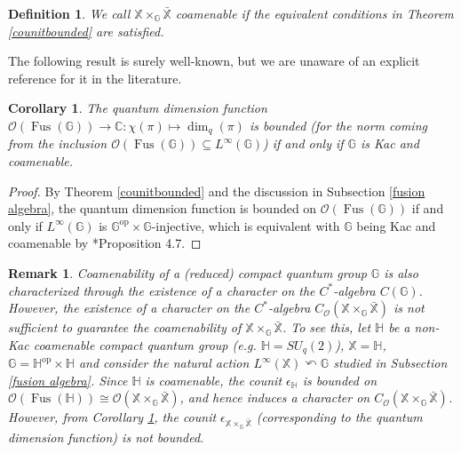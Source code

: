\documentclass[reqno]{amsart}
\numberwithin{equation}{section}
\newtheorem{Def}[Theorem]{Definition}
\newtheorem{Cor}[Theorem]{Corollary}
\newtheorem{Rem}[Theorem]{Remark}
\newcommand\XGX{\X\times_\G \bar{\X}}
\newcommand{\op}{\mathrm{op}}
\renewcommand{\H}{\mathbb{H}}
\newcommand{\mcO}{\mathcal{O}}
\newcommand{\C}{\mathbb{C}}
\newcommand{\G}{\mathbb{G}}
\newcommand{\X}{\mathbb{X}}
\begin{document}
\begin{Def}
    We call $\XGX$ coamenable if the equivalent conditions in Theorem \ref{counitbounded} are satisfied.
\end{Def}

The following result is surely well-known, but we are unaware of an explicit reference for it in the literature.

\begin{Cor}\label{coro}
The quantum dimension function
$\mcO(\operatorname{Fus}(\G))\to \C: \chi(\pi)\mapsto \dim_q(\pi)$
is bounded (for the norm coming from the inclusion $\mcO(\operatorname{Fus}(\G))\subseteq L^\infty(\G)$) if and only if $\G$ is Kac and coamenable.
\end{Cor}

\begin{proof}
    By Theorem \ref{counitbounded} and the discussion in Subsection \ref{fusion algebra}, the quantum dimension function is bounded on $\mcO(\operatorname{Fus}(\G))$ if and only if $L^\infty(\G)$ is $\G^{\op}\times \G$-injective, which is equivalent with $\G$ being Kac and coamenable by \cite{DR25a}*{Proposition 4.7}.
\end{proof}
\begin{Rem} Coamenability of a (reduced) compact quantum group $\G$ is also characterized through the existence of a character on the $C^*$-algebra $C(\G)$. However, the existence of a character on the $C^*$-algebra $C_\mcO(\XGX)$ is not sufficient to guarantee the coamenability of $\XGX$. To see this, let $\H$ be a non-Kac coamenable compact quantum group (e.g. $\H = SU_q(2)$), $\X= \H$, $\G= \H^{\op}\times \H$ and consider the natural action $L^\infty(\X)\curvearrowleft \G$ studied in Subsection \ref{fusion algebra}. Since $\H$ is coamenable, the counit $\epsilon_\H$ is bounded on $\mcO(\operatorname{Fus}(\H))\cong \mcO(\XGX)$, and hence induces a character on $C_\mcO(\XGX)$. However, from Corollary \ref{coro}, the counit $\epsilon_{\XGX}$ (corresponding to the quantum dimension function) is not bounded. 
\end{Rem}
\end{document}
